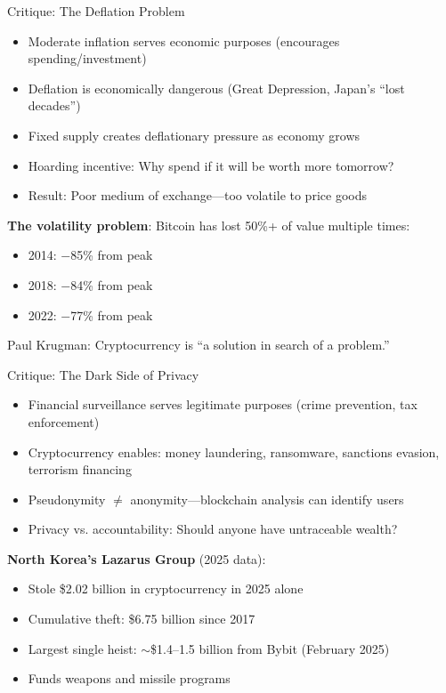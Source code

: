 ﻿\documentclass[aspectratio=169,11pt]{beamer}
\begin{document}
\begin{frame}{Critique: The Deflation Problem}
\begin{objectionbox}
\begin{itemize}
    \item Moderate inflation serves economic purposes (encourages spending/investment)
    \item Deflation is economically dangerous (Great Depression, Japan's ``lost decades'')
    \item Fixed supply creates deflationary pressure as economy grows
    \item Hoarding incentive: Why spend if it will be worth more tomorrow?
    \item Result: Poor medium of exchange---too volatile to price goods
\end{itemize}
\end{objectionbox}

\vspace{0.3em}
\textbf{The volatility problem}: Bitcoin has lost 50\%+ of value multiple times:
\begin{itemize}
    \item 2014: $-$85\% from peak
    \item 2018: $-$84\% from peak  
    \item 2022: $-$77\% from peak
\end{itemize}

Paul Krugman: Cryptocurrency is ``a solution in search of a problem.''
\end{frame}

\begin{frame}{Critique: The Dark Side of Privacy}
\begin{objectionbox}
\begin{itemize}
    \item Financial surveillance serves legitimate purposes (crime prevention, tax enforcement)
    \item Cryptocurrency enables: money laundering, ransomware, sanctions evasion, terrorism financing
    \item Pseudonymity $\neq$ anonymity---blockchain analysis can identify users
    \item Privacy vs. accountability: Should anyone have untraceable wealth?
\end{itemize}
\end{objectionbox}

\vspace{0.3em}
\textbf{North Korea's Lazarus Group} (2025 data):
\begin{itemize}
    \item Stole \$2.02 billion in cryptocurrency in 2025 alone
    \item Cumulative theft: \$6.75 billion since 2017
    \item Largest single heist: $\sim$\$1.4--1.5 billion from Bybit (February 2025)
    \item Funds weapons and missile programs
\end{itemize}
\end{frame}
\end{document}
